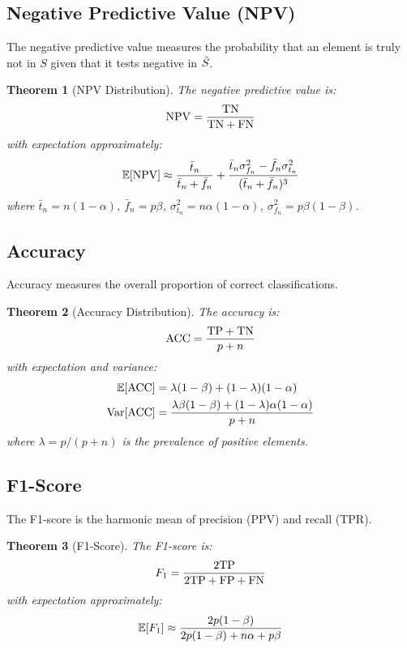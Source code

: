 \documentclass[11pt]{article}
\newcommand{\NPV}{\text{NPV}} %
\newcommand{\ACC}{\text{ACC}} %
\newcommand{\Fscore}{F_1}     %
\newtheorem{theorem}{Theorem}[section]
\begin{document}
\subsection{Negative Predictive Value (NPV)}

The negative predictive value measures the probability that an element is truly not in $S$ given that it tests negative in $\tilde{S}$.

\begin{theorem}[NPV Distribution]
The negative predictive value is:
\[
\NPV = \frac{\TN}{\TN + \FN}
\]
with expectation approximately:
\[
\Expect[\NPV] \approx \frac{\bar{t}_n}{\bar{t}_n + \bar{f}_n} + \frac{\bar{t}_n \sigma_{f_n}^2 - \bar{f}_n \sigma_{t_n}^2}{(\bar{t}_n + \bar{f}_n)^3}
\]
where $\bar{t}_n = n(1-\alpha)$, $\bar{f}_n = p\beta$, $\sigma_{t_n}^2 = n\alpha(1-\alpha)$, $\sigma_{f_n}^2 = p\beta(1-\beta)$.
\end{theorem}

\subsection{Accuracy}

Accuracy measures the overall proportion of correct classifications.

\begin{theorem}[Accuracy Distribution]
The accuracy is:
\[
\ACC = \frac{\TP + \TN}{p + n}
\]
with expectation and variance:
\begin{align}
\Expect[\ACC] &= \lambda(1-\beta) + (1-\lambda)(1-\alpha) \\
\text{Var}[\ACC] &= \frac{\lambda\beta(1-\beta) + (1-\lambda)\alpha(1-\alpha)}{p+n}
\end{align}
where $\lambda = p/(p+n)$ is the prevalence of positive elements.
\end{theorem}

\subsection{F1-Score}

The F1-score is the harmonic mean of precision (PPV) and recall (TPR).

\begin{theorem}[F1-Score]
The F1-score is:
\[
\Fscore = \frac{2\TP}{2\TP + \FP + \FN}
\]
with expectation approximately:
\[
\Expect[\Fscore] \approx \frac{2p(1-\beta)}{2p(1-\beta) + n\alpha + p\beta}
\]
\end{theorem}
\end{document}
